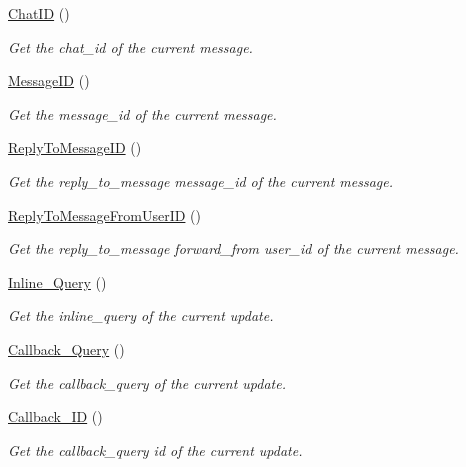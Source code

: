 \begin{DoxyCompactItemize}
\item 
\hyperlink{class_telegram_a4b624bab3560ed1e761aba1e7431cb6e}{Chat\-I\-D} ()
\begin{DoxyCompactList}\small\item\em Get the chat\-\_\-id of the current message. \end{DoxyCompactList}\item 
\hyperlink{class_telegram_a957f0d35d7a8cabb6116cc7bf51ceac2}{Message\-I\-D} ()
\begin{DoxyCompactList}\small\item\em Get the message\-\_\-id of the current message. \end{DoxyCompactList}\item 
\hyperlink{class_telegram_ad4dbc2a3a269f1e596a3d6b40c948ebf}{Reply\-To\-Message\-I\-D} ()
\begin{DoxyCompactList}\small\item\em Get the reply\-\_\-to\-\_\-message message\-\_\-id of the current message. \end{DoxyCompactList}\item 
\hyperlink{class_telegram_afd21e142f6ae005b8f72b39624da3505}{Reply\-To\-Message\-From\-User\-I\-D} ()
\begin{DoxyCompactList}\small\item\em Get the reply\-\_\-to\-\_\-message forward\-\_\-from user\-\_\-id of the current message. \end{DoxyCompactList}\item 
\hyperlink{class_telegram_a27937704e98b35ccaf2066aa74b1fbe1}{Inline\-\_\-\-Query} ()
\begin{DoxyCompactList}\small\item\em Get the inline\-\_\-query of the current update. \end{DoxyCompactList}\item 
\hyperlink{class_telegram_a891f961aa0d3272c01ac9fe64f10a714}{Callback\-\_\-\-Query} ()
\begin{DoxyCompactList}\small\item\em Get the callback\-\_\-query of the current update. \end{DoxyCompactList}\item 
\hyperlink{class_telegram_a61006cd19798be37ae51af5bc405ec71}{Callback\-\_\-\-I\-D} ()
\begin{DoxyCompactList}\small\item\em Get the callback\-\_\-query id of the current update. \end{DoxyCompactList}\item 

\end{DoxyCompactItemize}
